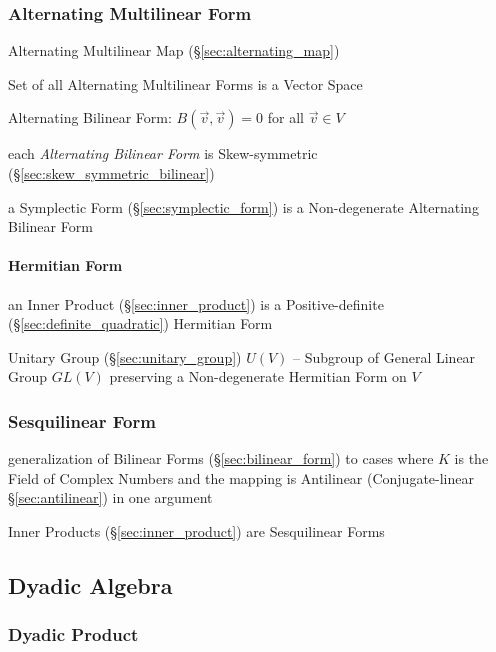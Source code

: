 \subsubsection{Alternating Multilinear Form}\label{sec:alternating_form}

Alternating Multilinear Map (\S\ref{sec:alternating_map})

Set of all Alternating Multilinear Forms is a Vector Space

Alternating Bilinear Form: $B(\vec{v},\vec{v}) = 0$ for all $\vec{v} \in V$

each \emph{Alternating Bilinear Form} is Skew-symmetric
(\S\ref{sec:skew_symmetric_bilinear})

a Symplectic Form (\S\ref{sec:symplectic_form}) is a Non-degenerate Alternating
Bilinear Form



\paragraph{Hermitian Form}\label{sec:hermitian_form}\hfill

an Inner Product (\S\ref{sec:inner_product}) is a Positive-definite
(\S\ref{sec:definite_quadratic}) Hermitian Form

Unitary Group (\S\ref{sec:unitary_group}) $U(V)$ -- Subgroup of General Linear
Group $GL(V)$ preserving a Non-degenerate Hermitian Form on $V$



\subsubsection{Sesquilinear Form}\label{sec:sesquilinear_form}

generalization of Bilinear Forms (\S\ref{sec:bilinear_form}) to cases where $K$
is the Field of Complex Numbers and the mapping is Antilinear (Conjugate-linear
\S\ref{sec:antilinear}) in one argument

Inner Products (\S\ref{sec:inner_product}) are Sesquilinear Forms



\subsection{Dyadic Algebra}\label{sec:dyadic_algebra}

\subsubsection{Dyadic Product}\label{sec:dyadic_product}

